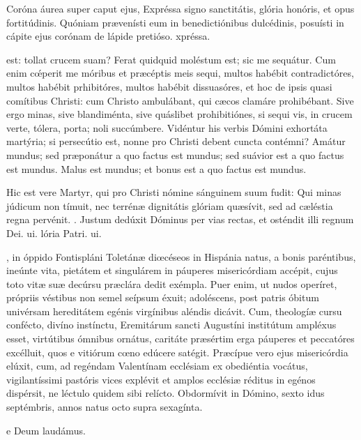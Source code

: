 \documentclass[fontsize=9pt,paper=A6,twoside,BCOR=1mm,DIV=22,headinclude]{scrarticle}
\begin{document}
\begin{multicols}{2}
\R Coróna áurea super caput ejus,
\red{*} Expréssa signo sanctitátis, glória honóris, et opus fortitúdinis.
\V Quóniam prævenísti eum in benedictiónibus dulcédinis, posuísti in cápite ejus corónam de lápide pretióso.
xpréssa.

 est: tollat crucem suam? Ferat quidquid moléstum est; sic me sequátur. Cum enim c\'œperit me móribus et præcéptis meis sequi, multos habébit contradictóres, multos habébit prhibitóres, multos habébit dissuasóres, et hoc de ipsis quasi comítibus Christi: cum Christo ambulábant, qui cæcos clamáre prohibébant. Sive ergo minas, sive blandiménta, sive quáslibet prohibitiónes, si sequi vis, in crucem verte, tólera, porta; noli succúmbere. Vidéntur his verbis Dómini exhortáta martýria; si persecútio est, nonne pro Christi debent cuncta contémni? Amátur mundus; sed præponátur a quo factus est mundus; sed suávior est a quo factus est mundus. Malus est mundus; et bonus est a quo factus est mundus.

\R Hic est vere Martyr, qui pro Christi nómine sánguinem suum fudit:
\red{*} Qui minas júdicum non tímuit, nec terrénæ dignitátis glóriam quæsívit, sed ad cæléstia regna pervénit.
\V. Justum dedúxit Dóminus per vias rectas, et osténdit illi regnum Dei.
ui.
lória Patri.
ui.


, in óppido Fontispláni Toletánæ diœcéseos in Hispánia natus, a bonis paréntibus, ineúnte vita, pietátem et singulárem in páuperes misericórdiam accépit, cujus toto vitæ suæ decúrsu præclára dedit exémpla. Puer enim, ut nudos operíret, própriis véstibus non semel seípsum éxuit; adoléscens, post patris óbitum univérsam hereditátem egénis virgínibus aléndis dicávit. Cum, theologíæ cursu confécto, divíno instínctu, Eremitárum sancti Augustíni institútum ampléxus esset, virtútibus ómnibus ornátus, caritáte præsértim erga páuperes et peccatóres excélluit, quos e vitiórum cœno edúcere satégit. Præcípue vero ejus misericórdia elúxit, cum, ad regéndam Valentínam ecclésiam ex obediéntia vocátus, vigilantíssimi pastóris vices explévit et amplos ecclésiæ réditus in egénos dispérsit, ne léctulo quidem sibi relícto. Obdormívit in Dómino, sexto idus septémbris, annos natus octo supra sexagínta.

e Deum laudámus.



\end{multicols}
\end{document}
